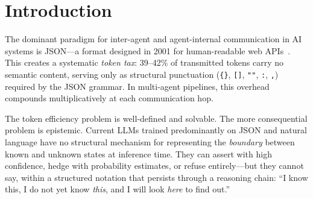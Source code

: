 \documentclass[11pt,a4paper]{article}
\begin{document}
\begin{abstract}
This second edition adds a semantic layer. The three conventions left informal in the first edition---what an atomic value means, what merging two documents means, and when the void marker \texttt{?} is mandatory---are now normative rules, each backed by a published, machine-verified theorem from the Dual-Rail Carrier Program (twelve releases with complete proofs, kernel-checked Lean~4 artifacts, and axiom audits; series hub: \url{https://github.com/ycmath/dual-rail-carrier-program}). Concretely: atomic values become dual-rail, so \emph{unknown} is structurally distinct from \emph{conflict}; merge is a kernel-checked CRDT join in which conflict is a value rather than an exception or a last-writer-wins loss; retraction is monotone, so the append-only property is derived from a theorem rather than decreed by policy; resolution records are a provably \emph{sufficient} audit surface, not merely a necessary one; and the void marker becomes mandatory exactly outside the self-dual safe fragment, replacing a style norm with a mechanical rule. The surface syntax is unchanged, version~1 documents parse unchanged, and all first-edition empirical results carry over intact.
\end{abstract}

\newpage
\tableofcontents
\newpage

\section{Introduction}
\label{sec:intro}

The dominant paradigm for inter-agent and agent-internal communication in AI systems is JSON---a format designed in 2001 for human-readable web APIs~\citep{crockford2006json}. This creates a systematic \emph{token tax}: 39--42\% of transmitted tokens carry no semantic content, serving only as structural punctuation (\texttt{\{\}}, \texttt{[]}, \texttt{""}, \texttt{:}, \texttt{,}) required by the JSON grammar. In multi-agent pipelines, this overhead compounds multiplicatively at each communication hop.

The token efficiency problem is well-defined and solvable. The more consequential problem is epistemic. Current LLMs trained predominantly on JSON and natural language have no structural mechanism for representing the \emph{boundary} between known and unknown states at inference time. They can assert with high confidence, hedge with probability estimates, or refuse entirely---but they cannot say, within a structured notation that persists through a reasoning chain: ``I know this, I do not yet know \emph{this}, and I will look \emph{here} to find out.''
\end{document}
